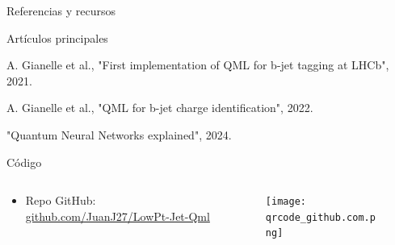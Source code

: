 \documentclass[aspectratio=43]{beamer}
\begin{document}
\begin{frame}{Referencias y recursos}
  \vspace{-1.3em}
  \begin{block}{Artículos principales}
    \begin{thebibliography}{3}
        A. Gianelle et al., "First implementation of QML for b-jet tagging at LHCb", 2021.
        \href{https://indico.cern.ch/event/1053287/contributions/4442055/attachments/2332563/3975381/qml@lhcb_zuliani.pdf}{}
      
        A. Gianelle et al., "QML for b-jet charge identification", 2022.
        \href{https://arxiv.org/pdf/2202.13943}{}
      
        "Quantum Neural Networks explained", 2024.
        \href{https://youtu.be/xL383DseSpE}{}
    \end{thebibliography}
  \end{block}
  
  \begin{alertblock}{Código}
    \vspace{-1em}
    \begin{columns}
      \begin{column}{0.65\textwidth}
        \begin{itemize}
          \item Repo GitHub: \href{https://github.com/JuanJ27/LowPt-Jet-Qml/tree/main}{github.com/JuanJ27/LowPt-Jet-Qml}
        \end{itemize}
      \end{column}
      \begin{column}{0.35\textwidth}
        \begin{figure}
          \centering
          \texttt{[image: qrcode\_github.com.png]}
        \end{figure}
      \end{column}
    \end{columns}
  \end{alertblock}
\end{frame}
\end{document}

